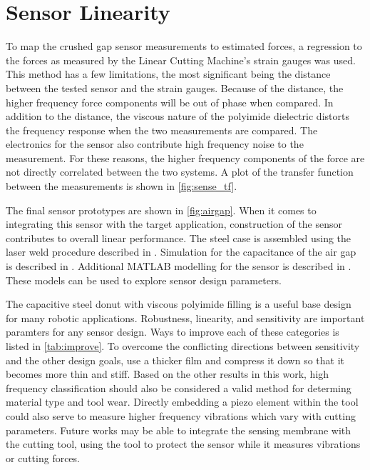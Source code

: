 \chapter{Sensor Linearity
\label{chap:10}}

To map the crushed gap sensor measurements to estimated forces, 
a regression to the forces as measured by the 
Linear Cutting Machine's strain gauges was used.
This method has a few limitations, the most significant
being the distance between the tested sensor and the strain gauges.
Because of the distance, the higher frequency force components will
be out of phase when compared. 
In addition to the distance, the viscous nature of the polyimide dielectric distorts the 
frequency response when the two measurements are compared.
The electronics for the sensor also contribute high frequency noise to the measurement.
For these reasons, the higher frequency components of the force are not directly correlated 
between the two systems. 
A plot of the transfer function between the measurements is shown in \ref{fig:sense_tf}.

The final sensor prototypes are shown in \ref{fig:airgap}.
When it comes to integrating this sensor with the target application,
construction of the sensor contributes to overall linear performance.
The steel case is assembled using the laser weld procedure described in .
Simulation for the capacitance of the air gap is described in .
Additional MATLAB modelling for the sensor is described in .
These models can be used to explore sensor design parameters.

The capacitive steel donut with viscous polyimide filling is a useful base design
for many robotic applications. Robustness, linearity, and sensitivity are important 
paramters for any sensor design. Ways to improve each of these categories is listed in \ref{tab:improve}.
To overcome the conflicting directions between sensitivity and the other design goals,
 use a thicker film and compress it down so that it becomes more thin and stiff.
Based on the other results in this work, high frequency classification 
should also be considered a valid method for
 determing material type and tool wear. 
Directly embedding a piezo element within the tool could
also serve to measure higher frequency vibrations which vary with cutting parameters.
Future works may be able to integrate the sensing membrane with the cutting tool,
using the tool to protect the sensor while it measures vibrations or cutting forces.


